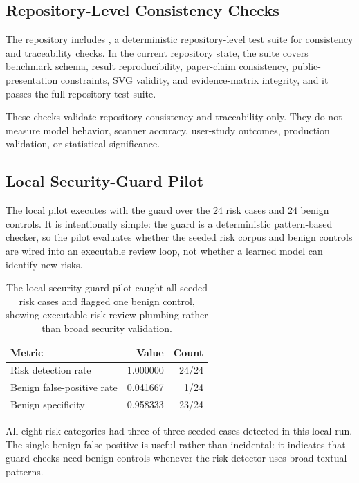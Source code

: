 \documentclass[11pt]{article}
\begin{document}
\subsection{Repository-Level Consistency Checks}

The repository includes , a deterministic
repository-level test suite for consistency and traceability checks. In the
current repository state, the suite covers benchmark schema, result
reproducibility, paper-claim consistency, public-presentation constraints, SVG
validity, and evidence-matrix integrity, and it passes the full repository
test suite.

These checks validate repository consistency and traceability only. They do not
measure model behavior, scanner accuracy, user-study outcomes, production
validation, or statistical significance.

\subsection{Local Security-Guard Pilot}

The local pilot executes  with
the  guard over the 24 risk cases and 24 benign controls. It
is intentionally simple: the guard is a deterministic pattern-based checker, so
the pilot evaluates whether the seeded risk corpus and benign controls are
wired into an executable review loop, not whether a learned model can identify
new risks.

\begin{table}[t]
\centering
\footnotesize
\begin{tabular}{lrr}
\toprule
\textbf{Metric} & \textbf{Value} & \textbf{Count} \\
\midrule
Risk detection rate & 1.000000 & 24/24 \\
Benign false-positive rate & 0.041667 & 1/24 \\
Benign specificity & 0.958333 & 23/24 \\
\bottomrule
\end{tabular}
\caption{The local security-guard pilot caught all seeded risk cases and
flagged one benign control, showing executable risk-review plumbing rather than
broad security validation.}
\label{tab:local-security-pilot}
\end{table}

All eight risk categories had three of three seeded cases detected in this
local run. The single benign false positive is useful rather than incidental:
it indicates that guard checks need benign controls whenever the risk detector
uses broad textual patterns.
\end{document}
